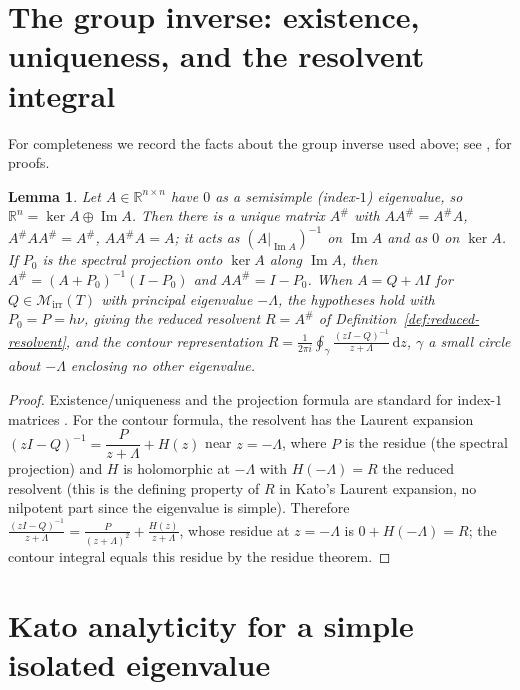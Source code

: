 \documentclass[11pt,reqno]{amsart}
\theoremstyle{plain}
\newtheorem{lemma}[theorem]{Lemma}
\theoremstyle{definition}
\theoremstyle{remark}
\newcommand{\R}{\mathbb{R}}
\newcommand{\dd}{\mathrm{d}}
\DeclareMathOperator{\Imm}{Im}
\begin{document}
\appendix


\section{The group inverse: existence, uniqueness, and the resolvent integral}\label{app:group}


For completeness we record the facts about the group inverse used above; see
\cite[Ch.~4]{CampbellMeyer2009},\cite{Meyer1975} for proofs.

\begin{lemma}\label{lem:group}
Let $A\in\R^{n\times n}$ have $0$ as a semisimple \textup{(}index-$1$\textup{)}
eigenvalue, so $\R^{n}=\ker A\oplus\Imm A$. Then there is a unique matrix
$A^{\#}$ with $AA^{\#}=A^{\#}A$, $A^{\#}AA^{\#}=A^{\#}$, $AA^{\#}A=A$; it acts as
$(A|_{\Imm A})^{-1}$ on $\Imm A$ and as $0$ on $\ker A$. If $P_0$ is the spectral
projection onto $\ker A$ along $\Imm A$, then $A^{\#}=(A+P_0)^{-1}(I-P_0)$ and
$AA^{\#}=I-P_0$. When $A=Q+\Lambda I$ for $Q\in\mathcal M_{\mathrm{irr}}(T)$ with
principal eigenvalue $-\Lambda$, the hypotheses hold with $P_0=P=h\nu$, giving the
reduced resolvent $R=A^{\#}$ of Definition~\ref{def:reduced-resolvent}, and the
contour representation
$R=\frac{1}{2\pi i}\oint_{\gamma}\frac{(zI-Q)^{-1}}{z+\Lambda}\,\dd z$,
$\gamma$ a small circle about $-\Lambda$ enclosing no other eigenvalue.
\end{lemma}

\begin{proof}
Existence/uniqueness and the projection formula are standard for index-$1$
matrices \cite[Thm.~4.5.2]{CampbellMeyer2009}. For the contour formula, the
resolvent has the Laurent expansion $(zI-Q)^{-1}=\dfrac{P}{z+\Lambda}+H(z)$ near
$z=-\Lambda$, where $P$ is the residue (the spectral projection) and $H$ is
holomorphic at $-\Lambda$ with $H(-\Lambda)=R$ the reduced resolvent (this is the
defining property of $R$ in Kato's Laurent expansion, no nilpotent part since the
eigenvalue is simple). Therefore
$\frac{(zI-Q)^{-1}}{z+\Lambda}=\frac{P}{(z+\Lambda)^{2}}+\frac{H(z)}{z+\Lambda}$,
whose residue at $z=-\Lambda$ is $0+H(-\Lambda)=R$; the contour integral equals this
residue by the residue theorem.
\end{proof}


\section{Kato analyticity for a simple isolated eigenvalue}\label{app:kato}
\end{document}
